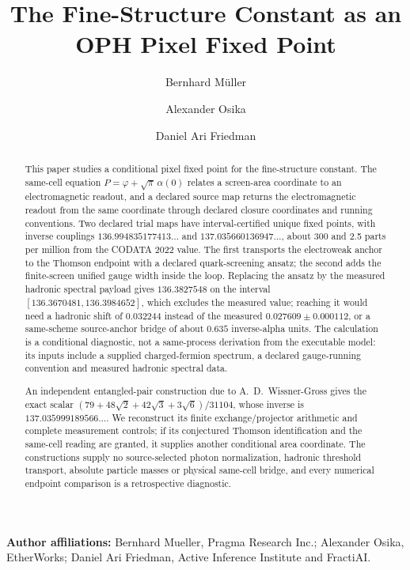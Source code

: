 \documentclass[11pt]{article}
\title{\textbf{The Fine-Structure Constant as an OPH Pixel Fixed Point}}
\author{Bernhard M\"uller \and Alexander Osika \and Daniel Ari Friedman}
\date{\OPHPaperReleaseDate}
\theoremstyle{remark}
\begin{document}
\maketitle
\OPHPaperReleaseBanner

\begin{center}
\small\textbf{Author affiliations:} Bernhard Mueller, Pragma Research Inc.; Alexander Osika, EtherWorks; Daniel Ari Friedman, Active Inference Institute and FractiAI.
\end{center}

\begin{abstract}
This paper studies a conditional pixel fixed point for the fine-structure
constant. The same-cell equation \(P=\varphi+\sqrt\pi\,\alpha(0)\) relates a
screen-area coordinate to an electromagnetic readout, and a declared source
map returns the electromagnetic readout from the same coordinate through
declared closure coordinates and running conventions. Two declared trial
maps have interval-certified unique fixed points, with inverse couplings
\(136.994835177413\ldots\) and \(137.035660136947\ldots\), about 300 and
2.5 parts per million from the CODATA 2022 value. The first transports the
electroweak anchor to the Thomson endpoint with a declared quark-screening
ansatz; the second adds the finite-screen unified gauge width inside the
loop. Replacing the ansatz by the measured hadronic spectral payload gives
\(136.3827548\) on the interval \([136.3670481,136.3984652]\), which excludes
the measured value; reaching it would need a hadronic shift of \(0.032244\)
instead of the measured \(0.027609\pm0.000112\), or a same-scheme source-anchor
bridge of about \(0.635\) inverse-alpha units. The calculation is a
conditional diagnostic, not a same-process derivation from the executable
model: its inputs include a supplied charged-fermion spectrum, a declared
gauge-running convention and measured hadronic spectral data.

An independent entangled-pair construction due to A.~D.~Wissner-Gross gives
the exact scalar \((79+48\sqrt2+42\sqrt3+3\sqrt6)/31104\), whose inverse is
\(137.035999189566\ldots\). We reconstruct its finite exchange/projector
arithmetic and complete measurement controls; if its conjectured Thomson
identification and the same-cell reading are granted, it supplies another
conditional area coordinate. The constructions supply no source-selected
photon normalization, hadronic threshold transport, absolute particle masses
or physical same-cell bridge, and every numerical endpoint comparison is a
retrospective diagnostic.
\end{abstract}
\end{document}
